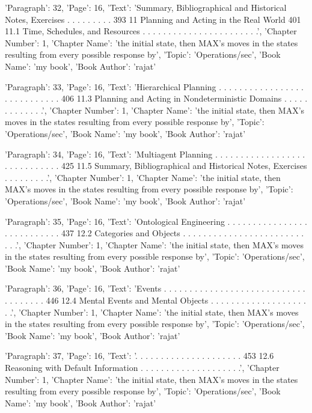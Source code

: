 {'Paragraph': 32, 'Page': 16, 'Text': 'Summary, Bibliographical and Historical Notes, Exercises . . . . . . . . . 393 11 Planning and Acting in the Real World 401 11.1 Time, Schedules, and Resources . . . . . . . . . . . . . . . . . . . . . . .', 'Chapter Number': 1, 'Chapter Name': 'the initial state, then MAX’s moves in the states resulting from every possible response by', 'Topic': 'Operations/sec', 'Book Name': 'my book', 'Book Author': 'rajat'}

{'Paragraph': 33, 'Page': 16, 'Text': 'Hierarchical Planning . . . . . . . . . . . . . . . . . . . . . . . . . . . . 406 11.3 Planning and Acting in Nondeterministic Domains . . . . . . . . . . . . .', 'Chapter Number': 1, 'Chapter Name': 'the initial state, then MAX’s moves in the states resulting from every possible response by', 'Topic': 'Operations/sec', 'Book Name': 'my book', 'Book Author': 'rajat'}

{'Paragraph': 34, 'Page': 16, 'Text': 'Multiagent Planning . . . . . . . . . . . . . . . . . . . . . . . . . . . . . 425 11.5 Summary, Bibliographical and Historical Notes, Exercises . . . . . . . . .', 'Chapter Number': 1, 'Chapter Name': 'the initial state, then MAX’s moves in the states resulting from every possible response by', 'Topic': 'Operations/sec', 'Book Name': 'my book', 'Book Author': 'rajat'}

{'Paragraph': 35, 'Page': 16, 'Text': 'Ontological Engineering . . . . . . . . . . . . . . . . . . . . . . . . . . . 437 12.2 Categories and Objects . . . . . . . . . . . . . . . . . . . . . . . . . . .', 'Chapter Number': 1, 'Chapter Name': 'the initial state, then MAX’s moves in the states resulting from every possible response by', 'Topic': 'Operations/sec', 'Book Name': 'my book', 'Book Author': 'rajat'}

{'Paragraph': 36, 'Page': 16, 'Text': 'Events . . . . . . . . . . . . . . . . . . . . . . . . . . . . . . . . . . . . 446 12.4 Mental Events and Mental Objects . . . . . . . . . . . . . . . . . . . . .', 'Chapter Number': 1, 'Chapter Name': 'the initial state, then MAX’s moves in the states resulting from every possible response by', 'Topic': 'Operations/sec', 'Book Name': 'my book', 'Book Author': 'rajat'}

{'Paragraph': 37, 'Page': 16, 'Text': '. . . . . . . . . . . . . . . . . . . . . 453 12.6 Reasoning with Default Information . . . . . . . . . . . . . . . . . . . .', 'Chapter Number': 1, 'Chapter Name': 'the initial state, then MAX’s moves in the states resulting from every possible response by', 'Topic': 'Operations/sec', 'Book Name': 'my book', 'Book Author': 'rajat'}

